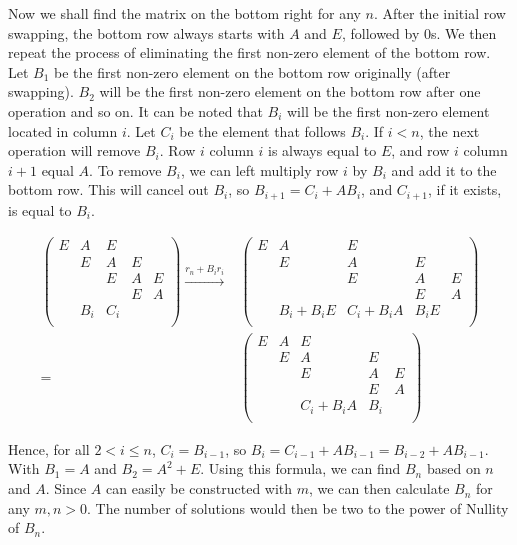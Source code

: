 \documentclass[a4paper, 12pt]{article}
\begin{document}
Now we shall find the matrix on the bottom right for any $n$. After the initial row swapping, the bottom row always starts with $A$ and $E$, followed by 0s. We then repeat the process of eliminating the first non-zero element of the bottom row. Let $B_1$ be the first non-zero element on the bottom row originally (after swapping). $B_2$ will be the first non-zero element on the bottom row after one operation and so on. It can be noted that $B_i$ will be the first non-zero element located in column $i$. Let $C_i$ be the element that follows $B_i$. If $i<n$, the next operation will remove $B_i$. Row $i$ column $i$ is always equal to $E$, and row $i$ column $i+1$ equal $A$. To remove $B_i$, we can left multiply row $i$ by $B_i$ and add it to the bottom row. This will cancel out $B_i$, so $B_{i+1} = C_i + AB_i$, and $C_{i+1}$, if it exists, is equal to $B_i$.
\begin{singlespace}
\begin{align*}
\begin{pmatrix}
E&A&E&&\\
&E&A&E&\\
&&E&A&E\\
&&&E&A\\
&B_{i}&C_{i}&&\\
\end{pmatrix}\overset{r_n+B_ir_i}{\longrightarrow}&
\begin{pmatrix}
E&A&E&&\\
&E&A&E&\\
&&E&A&E\\
&&&E&A\\
&B_{i}+B_{i}E&C_{i}+B_{i}A&B_{i}E&\\
\end{pmatrix}\\=&
\begin{pmatrix}
E&A&E&&\\
&E&A&E&\\
&&E&A&E\\
&&&E&A\\
&&C_{i}+B_{i}A&B_{i}&\\
\end{pmatrix}
\end{align*}
\end{singlespace}

Hence, for all $2<i\leq n$, $C_i = B_{i-1}$, so $B_i=C_{i-1}+AB_{i-1}=B_{i-2}+AB_{i-1}$. With $B_1 = A$ and $B_2=A^2+E$. Using this formula, we can find $B_n$ based on $n$ and $A$. Since $A$ can easily be constructed with $m$, we can then calculate $B_n$ for any $m, n>0$. The number of solutions would then be two to the power of Nullity of $B_n$.
\end{document}
